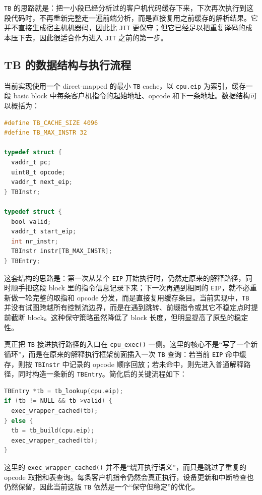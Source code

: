 \documentclass[a4paper]{article}
\begin{document}
\texttt{TB} 的思路就是：把一小段已经分析过的客户机代码缓存下来，下次再次执行到这段代码时，不再重新完整走一遍前端分析，而是直接复用之前缓存的解析结果。它并不直接生成宿主机机器码，因此比 \texttt{JIT} 更保守；但它已经足以把重复译码的成本压下去，因此很适合作为进入 \texttt{JIT} 之前的第一步。

\subsection{TB 的数据结构与执行流程}
当前实现使用一个 direct-mapped 的最小 \texttt{TB} cache，以 \texttt{cpu.eip} 为索引，缓存一段 basic block 中每条客户机指令的起始地址、opcode 和下一条地址。数据结构可以概括为：

\begin{lstlisting}[language=C]
#define TB_CACHE_SIZE 4096
#define TB_MAX_INSTR 32

typedef struct {
  vaddr_t pc;
  uint8_t opcode;
  vaddr_t next_eip;
} TBInstr;

typedef struct {
  bool valid;
  vaddr_t start_eip;
  int nr_instr;
  TBInstr instr[TB_MAX_INSTR];
} TBEntry;
\end{lstlisting}

这套结构的思路是：第一次从某个 \texttt{EIP} 开始执行时，仍然走原来的解释路径，同时顺手把这段 block 里的指令信息记录下来；下一次再遇到相同的 \texttt{EIP}，就不必重新做一轮完整的取指和 opcode 分发，而是直接复用缓存条目。当前实现中，\texttt{TB} 并没有试图跨越所有控制流边界，而是在遇到跳转、前缀指令或其它不稳定点时提前截断 block。这种保守策略虽然降低了 block 长度，但明显提高了原型的稳定性。

真正把 \texttt{TB} 接进执行路径的入口在 \texttt{cpu\_exec()} 一侧。这里的核心不是“写了一个新循环”，而是在原来的解释执行框架前面插入一次 \texttt{TB} 查询：若当前 \texttt{EIP} 命中缓存，则按 \texttt{TBInstr} 中记录的 opcode 顺序回放；若未命中，则先进入普通解释路径，同时构造一条新的 \texttt{TBEntry}。简化后的关键流程如下：

\begin{lstlisting}[language=C]
TBEntry *tb = tb_lookup(cpu.eip);
if (tb != NULL && tb->valid) {
  exec_wrapper_cached(tb);
} else {
  tb = tb_build(cpu.eip);
  exec_wrapper_cached(tb);
}
\end{lstlisting}

这里的 \texttt{exec\_wrapper\_cached()} 并不是“绕开执行语义”，而只是跳过了重复的 opcode 取指和表查询。每条客户机指令仍然会真正执行，设备更新和中断检查也仍然保留，因此当前这版 \texttt{TB} 依然是一个“保守但稳定”的优化。
\end{document}
